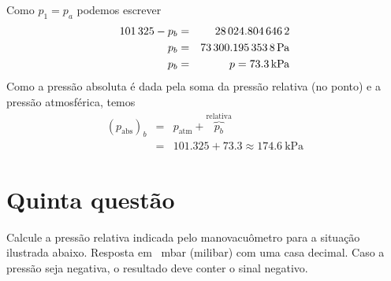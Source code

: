 \documentclass[
	a4paper,
	12pt,
	brazilian
]{article}
\begin{document}
	Como $p_{1}=p_{a}$ podemos escrever
	\begin{eqnarray}
		101\,325-p_{b}&=&28\,024.804\,646\,2\\
		p_{b}&=&\SI{73\,300.1953538}{\pascal}\\
		p_{b}&=&p=\SI{73.3}{\kilo\pascal}
	\end{eqnarray}
	Como a pressão absoluta é dada pela soma da pressão relativa (no ponto) e a pressão atmosférica, temos 
	\begin{eqnarray}
		(p_{\textrm{abs}})_{b}&=&p_{\textrm{atm}}+\overbrace{p_{b}}^{\textrm{relativa}}\\
		&=&101.325+73.3\approx\SI{174.6}{\kilo\pascal}
	\end{eqnarray}
	\section{Quinta questão}
	Calcule a pressão relativa indicada pelo manovacuômetro para a situação ilustrada abaixo. Resposta em \SI{}{\milli\bar} (milibar) com uma casa decimal. Caso a pressão seja negativa, o resultado deve conter o sinal negativo.\vspace{.5cm}
	
\end{document}
